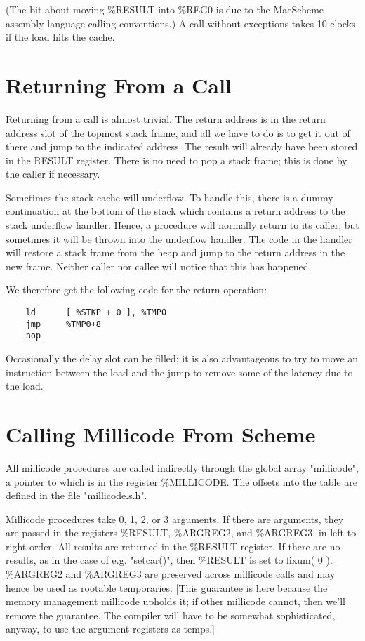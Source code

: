 (The bit about moving \%RESULT into \%REG0 is due to the MacScheme assembly
language calling conventions.) A call without exceptions takes 10 clocks if
the load hits the cache.

\section{Returning From a Call}

Returning from a call is almost trivial. The return address is in the
return address slot of the topmost stack frame, and all we have to do
is to get it out of there and jump to the indicated address. The result
will already have been stored in the RESULT register. There is no need
to pop a stack frame; this is done by the caller if necessary.

Sometimes the stack cache will underflow. To handle this, there is a dummy
continuation at the bottom of the stack which contains a return address to
the stack underflow handler. Hence, a procedure will normally return to its
caller, but sometimes it will be thrown into the underflow handler. The code
in the handler will restore a stack frame from the heap and jump to the
return address in the new frame. Neither caller nor callee will notice that
this has happened.

We therefore get the following code for the return operation:

\begin{minipage}{\linewidth}
\begin{verbatim}
    ld      [ %STKP + 0 ], %TMP0
    jmp     %TMP0+8
    nop
\end{verbatim}
\end{minipage}

Occasionally the delay slot can be filled; it is also advantageous to
try to move an instruction between the load and the jump to remove some
of the latency due to the load.

\section{Calling Millicode From Scheme}

All millicode procedures are called indirectly through the global
array "millicode", a pointer to which is in the register \%MILLICODE.
The offsets into the table are defined in the file "millicode.s.h".

Millicode procedures take 0, 1, 2, or 3 arguments. If there are
arguments, they are passed in the registers \%RESULT, \%ARGREG2, and
\%ARGREG3, in left-to-right order. All results are returned in the
\%RESULT register.  If there are no results, as in the case of e.g.
"setcar()", then \%RESULT is set to fixum( 0 ). \%ARGREG2 and \%ARGREG3 are
preserved across millicode calls and may hence be used as rootable
temporaries. [This guarantee is here because the memory management
millicode upholds it; if other millicode cannot, then we'll remove the
guarantee. The compiler will have to be somewhat sophisticated,
anyway, to use the argument registers as temps.]

